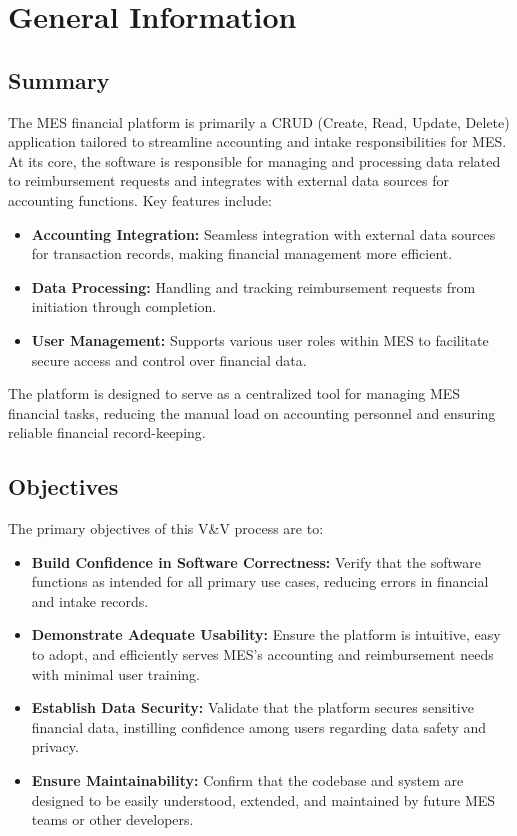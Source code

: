 \documentclass[12pt, titlepage]{article}
\begin{document}
\section{General Information}

\subsection{Summary}

The MES financial platform is primarily a CRUD (Create, Read, Update, Delete) application tailored to streamline accounting and intake responsibilities for MES. At its core, the software is responsible for managing and processing data related to reimbursement requests and integrates with external data sources for accounting functions. Key features include:

\begin{itemize}
    \item \textbf{Accounting Integration:} Seamless integration with external data sources for transaction records, making financial management more efficient.
    \item \textbf{Data Processing:} Handling and tracking reimbursement requests from initiation through completion.
    \item \textbf{User Management:} Supports various user roles within MES to facilitate secure access and control over financial data.
\end{itemize}

The platform is designed to serve as a centralized tool for managing MES financial tasks, reducing the manual load on accounting personnel and ensuring reliable financial record-keeping.

\subsection{Objectives}

The primary objectives of this V\&V process are to:

\begin{itemize}
    \item \textbf{Build Confidence in Software Correctness:} Verify that the software functions as intended for all primary use cases, reducing errors in financial and intake records.
    \item \textbf{Demonstrate Adequate Usability:} Ensure the platform is intuitive, easy to adopt, and efficiently serves MES's accounting and reimbursement needs with minimal user training.
    \item \textbf{Establish Data Security:} Validate that the platform secures sensitive financial data, instilling confidence among users regarding data safety and privacy.
    \item \textbf{Ensure Maintainability:} Confirm that the codebase and system are designed to be easily understood, extended, and maintained by future MES teams or other developers.
\end{itemize}
\end{document}
